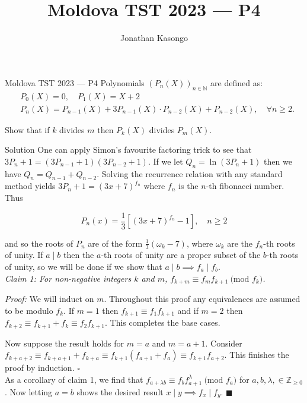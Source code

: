 \documentclass{article}
\author{Jonathan Kasongo}
\title{Moldova TST 2023 --- P4}
\begin{document}
\maketitle

\begin{problem}{Moldova TST 2023 --- P4}
Polynomials $\left(P_n(X)\right)_{n \in \mathbb{N}}$ are defined as:
$$
\begin{aligned}
& P_0(X)=0, \quad P_1(X)=X+2 \\
& P_n(X)=P_{n-1}(X)+3 P_{n-1}(X) \cdot P_{n-2}(X)+P_{n-2}(X), \quad
\forall n \geq 2 .
\end{aligned}
$$

Show that if $k$ divides $m$ then $P_k(X)$ divides $P_m(X)$.
\end{problem}

\begin{solution}{Solution}
One can apply Simon's favourite factoring trick to see that
$
3P_n + 1 = (3P_{n-1} + 1)(3P_{n-2} + 1)
$. If we let $Q_n = \ln (3P_n + 1)$ then we have
$Q_n = Q_{n-1} + Q_{n-2}$. Solving the recurrence relation with any
standard method yields
$3P_n + 1 = (3x+7)^{f_n}$ where $f_n$ is the $n$-th fibonacci number.
Thus

$$
P_n (x) = \frac13 [(3x+7)^{f_n} - 1], \quad n \geq 2
$$

and so the roots of $P_n$ are of the form $\frac13 (\omega_k - 7)$, where
$\omega_k$ are the $f_n$-th roots of unity. If $a \mid b$ then
the $a$-th roots of unity are a proper subset of the $b$-th roots of unity,
so we will be done if we show that $a \mid b \implies f_a \mid f_b$.
\\

\textit{Claim 1: For non-negative integers $k$ and $m$,
$f_{k+m} \equiv f_m f_{k+1} \ \text{(mod } f_k)$.} \vspace{0.2cm}

\textit{Proof:} We will induct on $m$. Throughout this proof any
equivalences are assumed to be modulo $f_k$.
If $m=1$ then $f_{k+1} \equiv f_1 f_{k+1}$ and if $m=2$ then $f_{k+2} \equiv
f_{k+1} + f_k \equiv f_2 f_{k+1}$. This completes the base cases.
\vspace{0.2cm}

Now suppose the result holds for $m=a$ and $m=a+1$. Consider
$f_{k+a+2} \equiv f_{k+a+1} + f_{k+a} \equiv f_{k+1}(f_{a+1} + f_a)
\equiv f_{k+1}f_{a+2}$. This finishes the proof by induction. $\square$
\\

As a corollary of claim 1, we find that $f_{a + \lambda b}
\equiv f_{b} f_{a+1}^{\lambda} \ \text{(mod } f_a)$ for $a,b,\lambda, \in
\mathbb{Z}_{\geq0}$. Now letting $a=b$ shows the desired result
$x \mid y \implies f_x\mid f_y$. $\blacksquare$
\end{solution}
\end{document}
